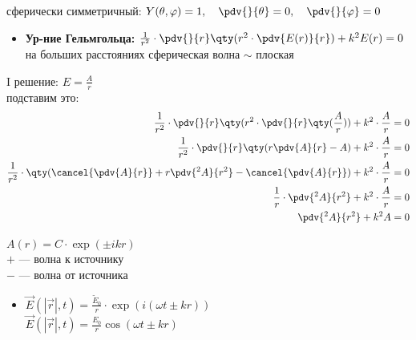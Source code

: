 сферически симметричный: $Y(\theta, \varphi) = 1, \quad \pdv{}{\theta} = 0, \quad \pdv{}{\varphi} = 0$

\begin{itemize}
	\item \textbf{Ур-ние Гельмгольца:} $\frac{1}{r^2} \cdot \pdv{}{r}\qty(r^2 \cdot \pdv{E(r)}{r}) + k^2 E(r) = 0$ на больших расстояниях сферическая волна $\sim$ плоская
\end{itemize}

I решение: $E = \frac{A}{r}$ \\
подставим это:
\begin{align*}
	\frac{1}{r^2} \cdot \pdv{}{r}\qty(r^2 \cdot \pdv{}{r}\qty(\frac{A}{r})) + k^2 \cdot \frac{A}{r} &= 0 \\
	\frac{1}{r^2} \cdot \pdv{}{r}\qty(r \pdv{A}{r} - A) + k^2 \cdot \frac{A}{r} &= 0 \\
	\frac{1}{r^2} \cdot \qty( \cancel{\pdv{A}{r}} + r \pdv{^2 A}{r^2} - \cancel{\pdv{A}{r}} ) + k^2 \cdot \frac{A}{r} &= 0 \\
	\frac{1}{r} \cdot \pdv{^2 A}{r^2} + k^2 \cdot \frac{A}{r} &= 0 \\
	\pdv{^2 A}{r^2} + k^2 A &= 0 
\end{align*}

\begin{nb}
	$A(r) = C \cdot \exp(\pm i k r)$ \\
	$+$ --- волна к источнику \\
	$-$ --- волна от источника
\end{nb}

\begin{itemize}
	\item $\vec{E}(|\vec{r}|, t) = \frac{\widetilde{E}_0}{r} \cdot \exp(i(\omega t \pm k r))$ \\
	$\vec{E}(|\vec{r}|, t) = \frac{E_0}{r} \cos(\omega t \pm k r)$
\end{itemize}

